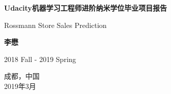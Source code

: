 \documentclass[a4paper]{article}
\begin{document}
\renewcommand{\contentsname}{目\ 录}
\renewcommand{\appendixname}{附录}
\renewcommand{\appendixpagename}{附录}
\renewcommand{\refname}{参考文献} 
\renewcommand{\figurename}{图}
\renewcommand{\tablename}{表}
\renewcommand{\today}{\number\year 年 \number\month 月 \number\day 日}

\begin{titlepage}
    \begin{center}
        \vspace*{1cm}
 
        \Huge
        \textbf{Udacity机器学习工程师进阶纳米学位毕业项目报告}
 
        \vspace{0.5cm}
        \LARGE
        Rossmann Store Sales Prediction
 
        \vspace{1.5cm}
 
        \textbf{李懋}
 
        \vfill
 
        2018 Fall - 2019 Spring\\
        
 
        \vspace{0.8cm}
 
 
        \Large
        成都，中国\\
        2019年3月
 
    \end{center}
\end{titlepage}


\end{document}
